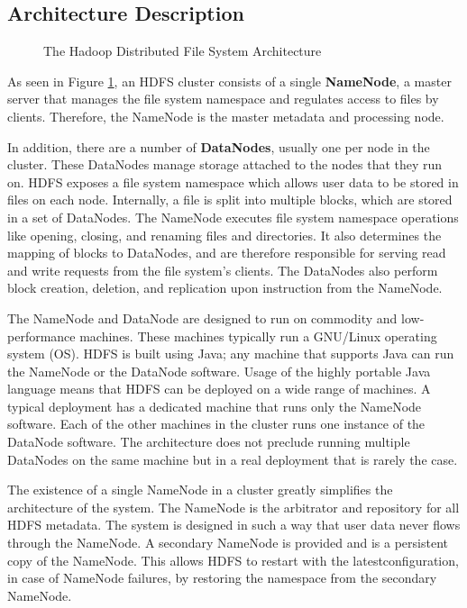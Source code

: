 \documentclass{article}
\begin{document}
\subsection{Architecture Description}

\begin{figure}
    \centering
    \caption{The Hadoop Distributed File System Architecture}
    \label{fig: hdfs}
\end{figure}

As seen in Figure \ref{fig: hdfs}, an HDFS cluster consists of a single \textbf{NameNode}, a master server that manages the file system namespace and regulates access to files by clients. Therefore, the NameNode is the master metadata and processing node. 

In addition, there are a number of \textbf{DataNodes}, usually one per node in the cluster. These DataNodes manage storage attached to the nodes that they run on. HDFS exposes a file system namespace which allows user data to be stored in files on each node. Internally, a file is split into multiple blocks, which are stored in a set of DataNodes. The NameNode executes file system namespace operations like opening, closing, and renaming files and directories. It also determines the mapping of blocks to DataNodes, and are therefore responsible for serving read and write requests from the file system’s clients. The DataNodes also perform block creation, deletion, and replication upon instruction from the NameNode. 

The NameNode and DataNode are designed to run on commodity and low-performance machines. These machines typically run a GNU/Linux operating system (OS). HDFS is built using Java; any machine that supports Java can run the NameNode or the DataNode software. Usage of the highly portable Java language means that HDFS can be deployed on a wide range of machines. A typical deployment has a dedicated machine that runs only the NameNode software. Each of the other machines in the cluster runs one instance of the DataNode software. The architecture does not preclude running multiple DataNodes on the same machine but in a real deployment that is rarely the case.

The existence of a single NameNode in a cluster greatly simplifies the architecture of the system. The NameNode is the arbitrator and repository for all HDFS metadata. The system is designed in such a way that user data never flows through the NameNode. A secondary NameNode is provided and is a persistent copy of the NameNode. This allows HDFS to restart with the latestconfiguration, in case of NameNode failures, by restoring the namespace from the secondary NameNode.
\end{document}
